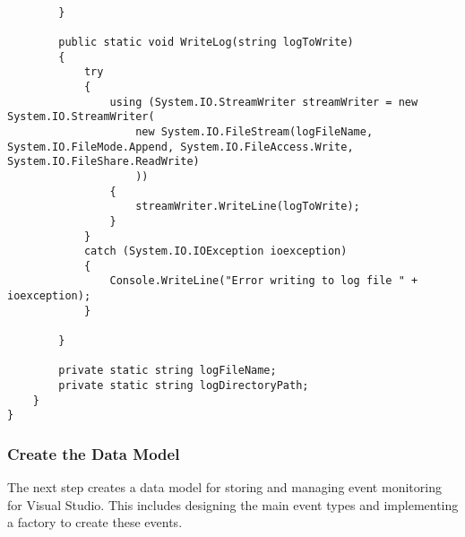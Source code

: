 \begin{enumerate}
\begin{lstlisting}[caption=Data Recorder Class,  label=code:DataRecorder]
        
        }

        public static void WriteLog(string logToWrite)
        {
            try
            {
                using (System.IO.StreamWriter streamWriter = new System.IO.StreamWriter(
                    new System.IO.FileStream(logFileName, System.IO.FileMode.Append, System.IO.FileAccess.Write, System.IO.FileShare.ReadWrite)
                    ))
                {
                    streamWriter.WriteLine(logToWrite);
                }
            }
            catch (System.IO.IOException ioexception)
            {
                Console.WriteLine("Error writing to log file " + ioexception);
            }
        
        }

        private static string logFileName;
        private static string logDirectoryPath;
    }
}

\end{lstlisting}
\end{enumerate}

\subsubsection{Create the Data Model}

The next step creates a data model for storing and managing event monitoring for Visual Studio. This includes designing the main event types and implementing a factory to create these events. 


